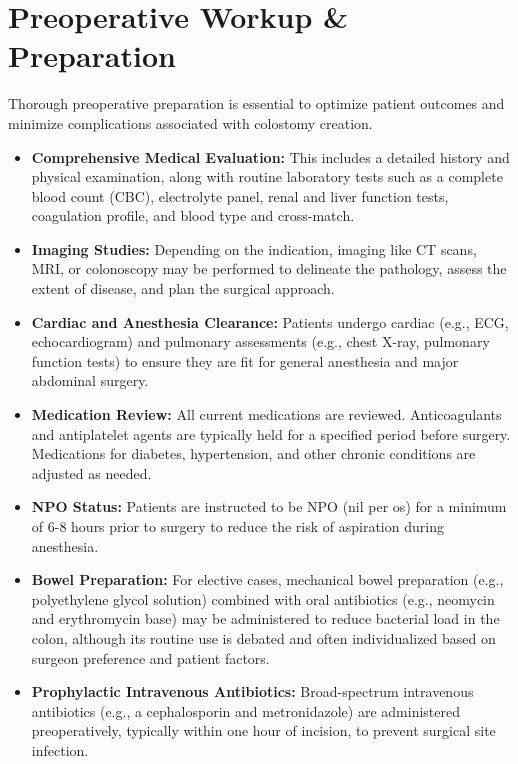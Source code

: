 \section*{Preoperative Workup \& Preparation}
Thorough preoperative preparation is essential to optimize patient outcomes and minimize complications associated with colostomy creation.

\begin{itemize}
  \item \textbf{Comprehensive Medical Evaluation:} This includes a detailed history and physical examination, along with routine laboratory tests such as a complete blood count (CBC), electrolyte panel, renal and liver function tests, coagulation profile, and blood type and cross-match.
  
  \item \textbf{Imaging Studies:} Depending on the indication, imaging like CT scans, MRI, or colonoscopy may be performed to delineate the pathology, assess the extent of disease, and plan the surgical approach.
  
  \item \textbf{Cardiac and Anesthesia Clearance:} Patients undergo cardiac (e.g., ECG, echocardiogram) and pulmonary assessments (e.g., chest X-ray, pulmonary function tests) to ensure they are fit for general anesthesia and major abdominal surgery.
  
  \item \textbf{Medication Review:} All current medications are reviewed. Anticoagulants and antiplatelet agents are typically held for a specified period before surgery. Medications for diabetes, hypertension, and other chronic conditions are adjusted as needed.
  
  \item \textbf{NPO Status:} Patients are instructed to be NPO (nil per os) for a minimum of 6-8 hours prior to surgery to reduce the risk of aspiration during anesthesia.
  
  \item \textbf{Bowel Preparation:} For elective cases, mechanical bowel preparation (e.g., polyethylene glycol solution) combined with oral antibiotics (e.g., neomycin and erythromycin base) may be administered to reduce bacterial load in the colon, although its routine use is debated and often individualized based on surgeon preference and patient factors.
  
  \item \textbf{Prophylactic Intravenous Antibiotics:} Broad-spectrum intravenous antibiotics (e.g., a cephalosporin and metronidazole) are administered preoperatively, typically within one hour of incision, to prevent surgical site infection.
  

\end{itemize}
